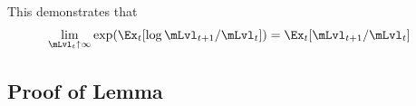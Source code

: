\documentclass[\econtexRoot/BufferStockTheory]{subfiles}
\begin{document}
This demonstrates that
\begin{equation}\begin{gathered}\begin{aligned}
  \lim_{\mLvl_{t} \uparrow \infty}   \exp(\Ex_{t}[\log \mLvl_{t+1}/\mLvl_{t}]) & = \Ex_{t}[\mLvl_{t+1}/\mLvl_{t}]
\end{aligned}\end{gathered}\end{equation}

\subsection{Proof of Lemma}%
\end{document}
